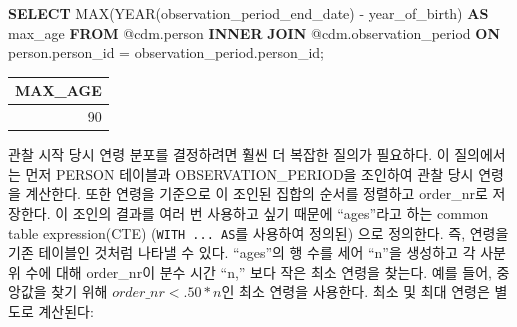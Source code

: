 \documentclass[10.5pt]{book}
\newenvironment{Shaded}{\begin{snugshade}}{\end{snugshade}}
\newcommand{\KeywordTok}[1]{\textcolor[rgb]{0.13,0.29,0.53}{\textbf{#1}}}
\newcommand{\DataTypeTok}[1]{\textcolor[rgb]{0.13,0.29,0.53}{#1}}
\newcommand{\FunctionTok}[1]{\textcolor[rgb]{0.00,0.00,0.00}{#1}}
\newcommand{\NormalTok}[1]{#1}
\theoremstyle{definition}
\theoremstyle{definition}
\theoremstyle{definition}
\theoremstyle{remark}
\begin{document}
\begin{Shaded}
\begin{Highlighting}[]
\KeywordTok{SELECT} \FunctionTok{MAX}\NormalTok{(}\DataTypeTok{YEAR}\NormalTok{(observation_period_end_date) -}
\NormalTok{           year_of_birth) }\KeywordTok{AS}\NormalTok{ max_age}
\KeywordTok{FROM}\NormalTok{ @cdm.person}
\KeywordTok{INNER} \KeywordTok{JOIN}\NormalTok{ @cdm.observation_period}
  \KeywordTok{ON}\NormalTok{ person.person_id = observation_period.person_id;}
\end{Highlighting}
\end{Shaded}

\begin{longtable}[]{@{}r@{}}
\toprule
MAX\_AGE\tabularnewline
\midrule
\endhead
90\tabularnewline
\bottomrule
\end{longtable}

관찰 시작 당시 연령 분포를 결정하려면 훨씬 더 복잡한 질의가 필요하다. 이
질의에서는 먼저 PERSON 테이블과 OBSERVATION\_PERIOD을 조인하여 관찰 당시
연령을 계산한다. 또한 연령을 기준으로 이 조인된 집합의 순서를 정렬하고
order\_nr로 저장한다. 이 조인의 결과를 여러 번 사용하고 싶기 때문에
``ages''라고 하는 common table expression(CTE) (\texttt{WITH\ ...\ AS}를
사용하여 정의된) 으로 정의한다. 즉, 연령을 기존 테이블인 것처럼 나타낼
수 있다. ``ages''의 행 수를 세어 ``n''을 생성하고 각 사분위 수에 대해
order\_nr이 분수 시간 ``n,'' 보다 작은 최소 연령을 찾는다. 예를 들어,
중앙값을 찾기 위해 \(order\_nr < .50 * n\)인 최소 연령을 사용한다. 최소
및 최대 연령은 별도로 계산된다:
\end{document}
